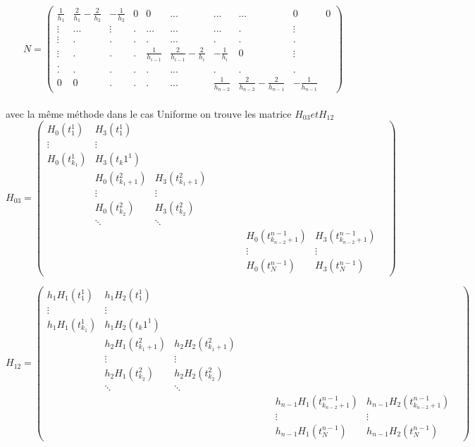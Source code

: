 \documentclass[a4paper,12pt]{article} %
\begin{document}
                \\
                \\$$N=\begin{pmatrix} \frac{1}{h_1}&\frac{2}{h_1}-\frac{2}{h_2}&-\frac{1}{h_2}&0&0&...&...&...&0&0 \\ \vdots&...&\vdots&.&...&...&...&.&\vdots \\ \vdots&.&.&.&.&...&.&.&.\\ \vdots&.&.&.&\frac{1}{h_{i-1}}&\frac{2}{h_{i-1}}-\frac{2}{h_i}&-\frac{1}{h_i}&0&\vdots \\. \\.&.&.&.&.&...&.&.&. \\ 0&0&.&.&.&...&\frac{1}{h_{n-2}}&\frac{2}{h_{n-2}}-\frac{2}{h_{n-1}}&-\frac{1}{h_{n-1}} \end{pmatrix}$$\\
                avec la même méthode dans le cas Uniforme on trouve les matrice $H_{03} et H_{12}$
                $$H_{03}=\begin{pmatrix} H_0(t_1^1)&H_3(t_1^1)& & & & & & & &  \\ \vdots&\vdots& & & & & & &  \\ H_0(t_{k_1}^1)&H_3(t_k1^1)& & & & & & & \\ &H_0(t_{{k_1}+1}^2)&H_3(t_{{k_1}+1}^2)& & & & & &   \\ &\vdots&\vdots& & & & & &  \\ &H_0(t_{k_2}^2)&H_3(t_{k_2}^2)& & & & & & \\ &\ddots&\ddots & & & & & & & \\ & & & & & & &H_0(t_{{k_{n-2}}+1}^{n-1}) &H_3(t_{{k_{n-2}}+1}^{n-1})\\ & & & & & & &\vdots &\vdots\\ & & & & & & &H_0(t_N^{n-1}) &H_3(t_N^{n-1}) \end{pmatrix}$$
                
                
                $$H_{12}=\begin{pmatrix} h_1H_1(t_1^1)&h_1H_2(t_1^1)& & & & & & & &  \\ \vdots&\vdots& & & & & & &  \\ h_1H_1(t_{k_1}^1)&h_1H_2(t_k1^1)& & & & & & & \\ &h_2H_1(t_{{k_1}+1}^2)&h_2H_2(t_{{k_1}+1}^2)& & & & & &   \\ &\vdots&\vdots& & & & & &  \\ &h_2H_1(t_{k_2}^2)&h_2H_2(t_{k_2}^2)& & & & & & \\ &\ddots&\ddots & & & & & & & \\ & & & & & & &h_{n-1}H_1(t_{{k_{n-2}}+1}^{n-1}) &h_{n-1}H_2(t_{{k_{n-2}}+1}^{n-1})\\ & & & & & & &\vdots &\vdots\\ & & & & & & &h_{n-1}H_1(t_N^{n-1}) &h_{n-1}H_2(t_N^{n-1}) \end{pmatrix}$$
                
\end{document}
